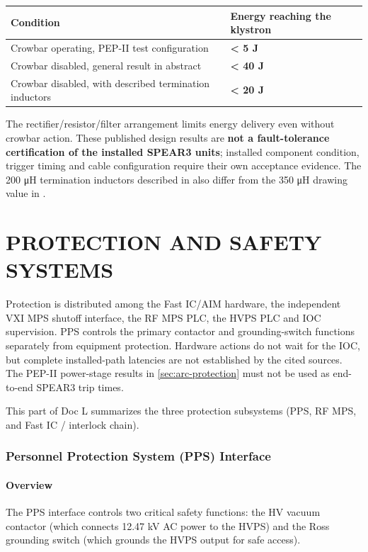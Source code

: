 \begin{longtable}[]{@{}ll@{}}
\toprule\noalign{}
Condition & Energy reaching the klystron \\
\midrule\noalign{}
\endhead
\bottomrule\noalign{}
\endlastfoot
Crowbar operating, PEP-II test configuration & \textbf{\textless{} 5 J} \\
Crowbar disabled, general result in abstract & \textbf{\textless{} 40 J} \\
Crowbar disabled, with described termination inductors & \textbf{\textless{} 20 J} \\
\end{longtable}

The rectifier/resistor/filter arrangement limits energy delivery even without crowbar action. These published design results are \textbf{not a fault-tolerance certification of the installed SPEAR3 units}; installed component condition, trigger timing and cable configuration require their own acceptance evidence. The 200 μH termination inductors described in  also differ from the 350 μH drawing value in .


\FloatBarrier\clearpage
\part{PROTECTION AND SAFETY SYSTEMS}

Protection is distributed among the Fast IC/AIM hardware, the independent VXI MPS shutoff interface, the RF MPS PLC, the HVPS PLC and IOC supervision. PPS controls the primary contactor and grounding-switch functions separately from equipment protection. Hardware actions do not wait for the IOC, but complete installed-path latencies are not established by the cited sources. The PEP-II power-stage results in \cref{sec:arc-protection} must not be used as end-to-end SPEAR3 trip times.

This part of Doc L summarizes the three protection subsystems (PPS, RF MPS, and Fast IC / interlock chain).


\section{Personnel Protection System (PPS) Interface}\label{sec:pps}

\subsection{Overview}

The PPS interface controls two critical safety functions: the HV vacuum contactor (which connects 12.47 kV AC power to the HVPS) and the Ross grounding switch (which grounds the HVPS output for safe access).

